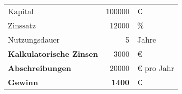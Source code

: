 \begin{table}[H]

    \begin{tabular}{l r l}
        Kapital                 & 100000    & €\\
        Zinssatz                & 12000     & \%\\
        Nutzungsdauer           & 5         & Jahre\\
        \midrule
        \textbf{Kalkulatorische Zinsen} & 3000 & €\\
        \textbf{Abschreibungen} & 20000 & € pro Jahr\\
        \midrule
        \textbf{Gewinn}         & \textbf{1400}  & €
    \end{tabular}
    \label{tab:bla}
\end{table}


